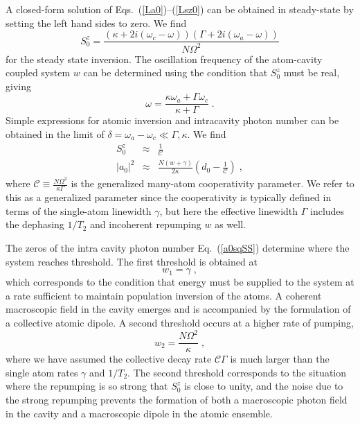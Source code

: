 \documentclass[aps,
twocolumn,
showpacs,
superscriptaddress,groupedaddress]{revtex4}
\begin{document}
A closed-form solution of Eqs.~(\ref{La0})--(\ref{Lsz0}) can be
obtained in steady-state by setting the left hand sides to zero.  We
find
\begin{equation}
S_0^{z}=
\frac{(\kappa+2i(\omega_c-\omega))(\Gamma+2i(\omega_a-\omega))}{N\Omega^2}
\label{Sz01}
\end{equation}
for the steady state inversion. The oscillation frequency of the
atom-cavity coupled system $w$ can be determined using the condition
that $S_0^{z}$ must be real, giving
\begin{equation}
\omega = \frac{\kappa \omega_a + \Gamma \omega_c}{\kappa+\Gamma}\;.
\label{atomcavityfrequencycenter1}
\end{equation}
Simple expressions for atomic inversion and intracavity photon number
can be obtained in the limit of
$\delta = \omega_a-\omega_c \ll \Gamma,\kappa$. We find
\begin{eqnarray}
  S_0^{z}&\approx& \frac{1}{\mathcal{C}}\nonumber\\
  |a_0|^2&\approx&\frac{N(w+\gamma)}{2 \kappa}
             \left(d_0 - \frac{1}{\mathcal{C}}\right)\;,
\label{a0sqSS}
\end{eqnarray}
where $\mathcal{C}\equiv \frac{N \Omega^2}{\kappa \Gamma}$ is the
generalized many-atom cooperativity parameter.  We refer to this as a
generalized parameter since the cooperativity is typically defined in
terms of the single-atom linewidth $\gamma$, but here the effective
linewidth $\Gamma$ includes the dephasing $1/T_2$ and incoherent
repumping $w$ as well.


The zeros of the intra cavity photon number Eq.~(\ref{a0sqSS}) determine
where the system reaches threshold.  The first threshold is obtained at
\begin{equation}
w_1 = \gamma\;,
\label{FirstThreshold}
\end{equation}
which corresponds to the condition that energy must be supplied to the
system at a rate sufficient to maintain population inversion of the
atoms.  A coherent macroscopic field in the cavity emerges and is
accompanied by the formulation of a collective atomic dipole.  A second
threshold occurs at a higher rate of pumping,
\begin{equation}
w_2 =  \frac{N \Omega^2}{\kappa}\;,
\end{equation} 
where we have assumed the collective decay rate $\mathcal{C}\Gamma$ is
much larger than the single atom rates $\gamma$ and $1/T_2$.  The second
threshold corresponds to the situation where the repumping is so strong
that $S_0^{z}$ is close to unity, and the noise due to the strong
repumping prevents the formation of both a macroscopic photon field in
the cavity and a macroscopic dipole in the atomic ensemble.
\end{document}
